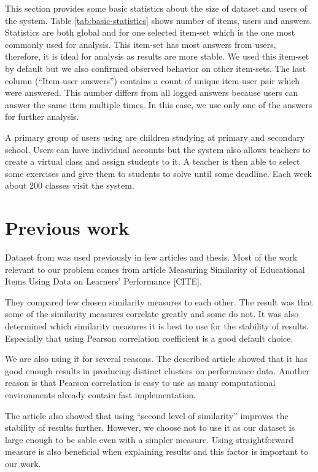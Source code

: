 \documentclass[
  digital, %
  table,   %
  nolof,     %
  nolot,     %
  nocover
]{fithesis3}
\begin{document}
This section provides some basic statistics about the size of dataset and users of the system. Table \ref{tab:basic-statistics} shows number of items, users and answers. Statistics are both global and for one selected item-set which is the one most commonly used for analysis. This item-set has most answers from users, therefore, it is ideal for analysis as results are more stable. We used this item-set by default but we also confirmed observed behavior on other item-sets. The last column (``Item-user answers'') contains a count of unique item-user pair which were answered. This number differs from all logged answers because users can answer the same item multiple times. In this case, we use only one of the answers for further analysis.


A primary group of users using \umimeCesky{} are children studying at primary and secondary school. Users can have individual accounts
but the system also allows teachers to create a virtual class and assign students to it. A teacher is then able to select some exercises and give them to students to solve until some deadline. Each week about 200 classes visit the system.


\section{Previous work}\label{previous-work}

Dataset from \umimeCesky{} was used previously in few articles and thesis. Most of the work relevant to our problem comes from article Measuring Similarity of Educational Items Using Data on Learners’ Performance [CITE].

They compared few chosen similarity measures to each other. The result was that some of the similarity measures correlate greatly and some do not. It was also determined which similarity measures it is best to use for the stability of results. Especially that using Pearson correlation coefficient is a good default choice.

We are also using it for several reasons. The described article showed that it has good enough results in producing distinct clusters on performance data. Another reason is that Pearson correlation is easy to use as many computational environments already contain fast implementation.

The article also showed that using ``second level of similarity'' improves the stability of results further. However, we choose not to use it as our dataset is large enough to be sable even with a simpler measure. Using straightforward measure is also beneficial when explaining results and this factor is important to our work.
\end{document}

